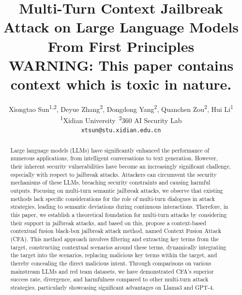 \documentclass[11pt]{article}
\title{Multi-Turn Context Jailbreak Attack on Large Language Models From First Principles \\{\color{warningcolor} \normalsize WARNING: This paper contains context which is toxic in nature.}}
\author{Xiongtao Sun\textsuperscript{1,2}, Deyue Zhang\textsuperscript{2}, 
Dongdong Yang\textsuperscript{2}, 
Quanchen Zou\textsuperscript{2}, Hui Li\textsuperscript{1}\\
\textsuperscript{1}Xidian University~\textsuperscript{2}360 AI Security Lab\\
\texttt{xtsun@stu.xidian.edu.cn}\\}
\begin{document}
\maketitle
\begin{abstract}
Large language models (LLMs) have significantly enhanced the performance of numerous applications, from intelligent conversations to text generation. However, their inherent security vulnerabilities have become an increasingly significant challenge, especially with respect to jailbreak attacks. Attackers can circumvent the security mechanisms of these LLMs, breaching security constraints and causing harmful outputs. Focusing on multi-turn semantic jailbreak attacks, we observe that existing methods lack specific considerations for the role of multi-turn dialogues in attack strategies, leading to semantic deviations during continuous interactions. Therefore, in this paper, we establish a theoretical foundation for multi-turn attacks by considering their support in jailbreak attacks, and based on this, propose a context-based contextual fusion black-box jailbreak attack method, named Context Fusion Attack (CFA). This method approach involves filtering and extracting key terms from the target, constructing contextual scenarios around these terms, dynamically integrating the target into the scenarios, replacing malicious key terms within the target, and thereby concealing the direct malicious intent. Through comparisons on various mainstream LLMs and red team datasets, we have demonstrated CFA’s superior success rate, divergence, and harmfulness compared to other multi-turn attack strategies, particularly showcasing significant advantages on Llama3 and GPT-4.
\end{abstract}







\end{document}
